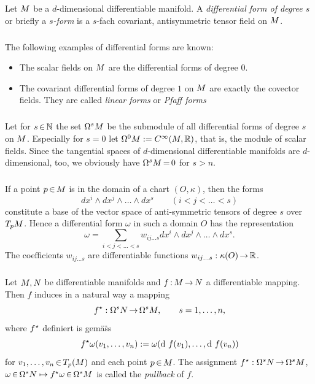 \documentclass[11pt,twoside]{article}
\begin{document}
\begin{definition}
Let ${M}$ be a $d$-dimensional differentiable manifold.
A \textit{differential form of degree $s$} or briefly a \textit{$s$-form}
is a $s$-fach covariant, antisymmetric tensor field on ${M}$.
\end{definition}

\subparagraph{}
The following examples of differential forms are known:

\begin{itemize}[leftmargin=15pt]
\item[1.]
The scalar fields on ${M}$ are the differential forms of degree $0$.
\item[2.]
The covariant differential forms of degree $1$ on ${M}$ are
exactly the covector fields.
They are called \textit{linear forms} or \textit{Pfaff forms}
\end{itemize}

\subparagraph{}
Let for $s {\,\in\,} {\mathbb{N}}$ the set $\Omega^s {M}$
be the submodule of all differential forms of degree $s$ on ${M}$.
Especially for $s=0$ let $\Omega^0 {M} := C^{\infty}({M},{\mathbb{R}})$,
that is,
the module of scalar fields.
Since the tangential spaces of $d$-dimensional differentiable manifolds
are $d$-dimensional,
too,
we obviously have $\Omega^s {M} {\,=\,} 0$ for $s > n$.

\subparagraph{}
If a point $p {\,\in\,} {M}$ is in the domain of a chart $(O,\kappa)$,
then the forms
\[
dx^i \wedge dx^j \wedge \ldots \wedge dx^s \qquad (i < j < \ldots < s)
\]
constitute a base of the vector space of anti-symmetric tensors of degree $s$
over $T_p {M}$.
Hence a differential form $\omega$ in such a domain $O$
has the representation
\[
\omega = \sum_{i < j < \ldots < s} w_{ij\ldots s}
dx^i \wedge dx^j \wedge \ldots \wedge dx^s.
\]
The coefficients $w_{ij\ldots s}$ are differentiable functions
$w_{ij\ldots s}:\kappa(O) {\,\to\,} {\mathbb{R}}$.

\subparagraph{}
Let ${M},{N}$ be differentiable manifolds and
$f{\,:\,}{M} {\,\to\,} {N}$ a differentiable mapping.
Then $f$ induces in a natural way a mapping
\[
f^\star : \Omega^s {N} {\,\to\,} \Omega^s {M}, \qquad s=1,\ldots,n,
\]
where $f^\star$ definiert is gem\"a\"ss
\[
f^\star \omega(v_1,\ldots,v_n) := \omega(\operatorname{d}\,f(v_1),\ldots,
                                      \operatorname{d}\,f(v_n))
\]
for $v_1,\ldots,v_n {\,\in\,} T_p({M})$ and each point $p {\,\in\,} {M}$.
The assignment $f^\star : \Omega^s {N} {\,\to\,} \Omega^s {M}$,
$\omega {\,\in\,} \Omega^s {N} \mapsto f^\star \omega {\,\in\,} \Omega^s {M}$
is called the \textit{pullback} of $f$.
\end{document}
